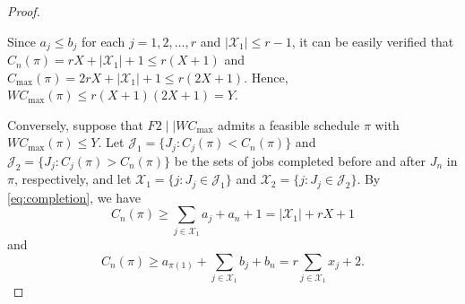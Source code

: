 \documentclass[12pt]{article}
\renewcommand{\thefigure}{\arabic{figure}}
\begin{document}
\begin{sloppypar}
\begin{proof}
\begin{figure}[H]
                \label{fig:nphard-partition}
            \end{figure}
            
            Since $a_j \leq b_j$ for each $j=1, 2, \ldots, r$ and $|\mathcal{X}_1| \leq r-1$, it can be easily verified that $C_n(\pi)=rX +|\mathcal{X}_1|+1 \leq r(X+1)$ and $C_{\max}(\pi)=2rX+|\mathcal{X}_1|+1 \leq r(2X+1)$. Hence, $W C_{\max}(\pi) \leq r(X+1)(2X+1)= Y$.
            
            Conversely, suppose that $F2 \mid \mid W C_{\max}$ admits a feasible schedule $\pi$ with $W C_{\max}(\pi) \leq Y$. Let $\mathcal{J}_1=\{J_j: C_j(\pi) <C_n(\pi)\}$ and $\mathcal{J}_2=\{J_j: C_j(\pi) > C_n(\pi)\}$ be the sets of jobs completed before and after $J_n$ in $\pi$, respectively, and let $\mathcal{X}_1=\{j: J_j \in \mathcal{J}_1\}$ and $\mathcal{X}_2=\{j: J_j \in \mathcal{J}_2\}$. By \cref{eq:completion}, we have
            \begin{equation}\label{eq:completetime1}
                C_n(\pi) \geq \sum_{j \in \mathcal{X}_1} a_j +a_n+ 1=|\mathcal{X}_1| +r X + 1
            \end{equation}
            and
            \begin{equation}\label{eq:completetime2}
                C_n(\pi) \geq a_{\pi(1)}+\sum_{j \in \mathcal{X}_1} b_j+b_n = r \sum_{j \in \mathcal{X}_1} x_j + 2.
            \end{equation}
            

\end{proof}
\end{sloppypar}
\end{document}
